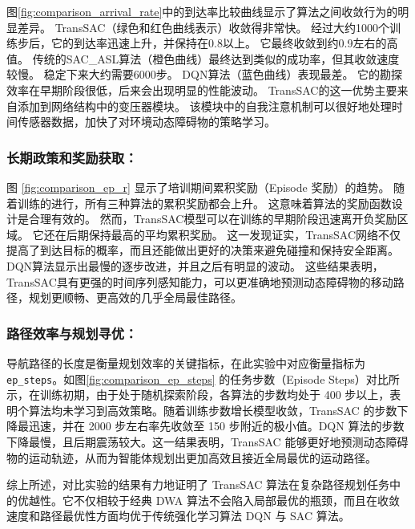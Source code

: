 图\ref{fig:comparison_arrival_rate}中的到达率比较曲线显示了算法之间收敛行为的明显差异。 TransSAC（绿色和红色曲线表示）收敛得非常快。 经过大约1000个训练步后，它的到达率迅速上升，并保持在0.8以上。 它最终收敛到约0.9左右的高值。 传统的SAC\_ASL算法（橙色曲线）最终达到类似的成功率，但其收敛速度较慢。 稳定下来大约需要6000步。 DQN算法（蓝色曲线）表现最差。 它的勘探效率在早期阶段很低，后来会出现明显的性能波动。 TransSAC的这一优势主要来自添加到网络结构中的变压器模块。 该模块中的自我注意机制可以很好地处理时间传感器数据，加快了对环境动态障碍物的策略学习。

\subsubsection{长期政策和奖励获取：}
图 \ref{fig:comparison_ep_r} 显示了培训期间累积奖励（Episode 奖励）的趋势。 随着训练的进行，所有三种算法的累积奖励都会上升。 这意味着算法的奖励函数设计是合理有效的。 然而，TransSAC模型可以在训练的早期阶段迅速离开负奖励区域。 它还在后期保持最高的平均累积奖励。 这一发现证实，TransSAC网络不仅提高了到达目标的概率，而且还能做出更好的决策来避免碰撞和保持安全距离。 DQN算法显示出最慢的逐步改进，并且之后有明显的波动。 这些结果表明，TransSAC具有更强的时间序列感知能力，可以更准确地预测动态障碍物的移动路径，规划更顺畅、更高效的几乎全局最佳路径。

\subsubsection{路径效率与规划寻优：} 导航路径的长度是衡量规划效率的关键指标，在此实验中对应衡量指标为\texttt{ep\_steps}。如图\ref{fig:comparison_ep_steps} 的任务步数（Episode Steps）对比所示，在训练初期，由于处于随机探索阶段，各算法的步数均处于 400 步以上，表明个算法均未学习到高效策略。随着训练步数增长模型收敛，TransSAC 的步数下降最迅速，并在 2000 步左右率先收敛至 150 步附近的极小值。DQN 算法的步数下降最慢，且后期震荡较大。这一结果表明，TransSAC 能够更好地预测动态障碍物的运动轨迹，从而为智能体规划出更加高效且接近全局最优的运动路径。

综上所述，对比实验的结果有力地证明了 TransSAC 算法在复杂路径规划任务中的优越性。它不仅相较于经典 DWA 算法不会陷入局部最优的瓶颈，而且在收敛速度和路径最优性方面均优于传统强化学习算法 DQN 与 SAC 算法。